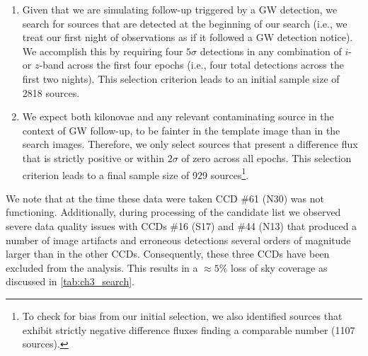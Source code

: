 \begin{enumerate}
\item Given that we are simulating follow-up triggered by a GW detection, we search for sources that are detected at the beginning of our search (i.e., we treat our first night of observations as if it followed a GW detection notice). We accomplish this by requiring four $5\sigma$ detections in any combination of $i$- or $z$-band across the first four epochs (i.e., four total detections across the first two nights).  This selection criterion leads to an initial sample size of 2818 sources.

\item We expect both kilonovae and any relevant contaminating source in the context of GW follow-up, to be fainter in the template image than in the search images. Therefore, we only select sources that present a difference flux that is strictly positive or within $2\sigma$ of zero across all epochs. This selection criterion leads to a final sample size of 929 sources\footnote{To check for bias from our initial selection, we also identified sources that exhibit strictly negative difference fluxes finding a comparable number (1107 sources).}.
\end{enumerate}

We note that at the time these data were taken CCD \#61 (N30) was not functioning. Additionally, during processing of the candidate list we observed severe data quality issues with CCDs \#16 (S17) and \#44 (N13) that produced a number of image artifacts and erroneous detections several orders of magnitude larger than in the other CCDs. Consequently, these three CCDs have been excluded from the analysis. This results in a $\approx 5\%$ loss of sky coverage as discussed in \cref{tab:ch3_search}.

